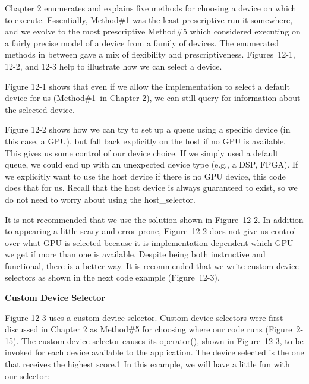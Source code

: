 Chapter 2 enumerates and explains five methods for choosing a device on which to execute. Essentially, Method\#1 was the least prescriptive run it somewhere, and we evolve to the most prescriptive Method\#5 which considered executing on a fairly precise model of a device from a family of devices. The enumerated methods in between gave a mix of flexibility and prescriptiveness. Figures 12-1, 12-2, and 12-3 help to illustrate how we can select a device.\par

Figure 12-1 shows that even if we allow the implementation to select a default device for us (Method\#1 in Chapter 2), we can still query for information about the selected device.\par

Figure 12-2 shows how we can try to set up a queue using a specific device (in this case, a GPU), but fall back explicitly on the host if no GPU is available. This gives us some control of our device choice. If we simply used a default queue, we could end up with an unexpected device type (e.g., a DSP, FPGA). If we explicitly want to use the host device if there is no GPU device, this code does that for us. Recall that the host device is always guaranteed to exist, so we do not need to worry about using the host\_selector.\par

It is not recommended that we use the solution shown in Figure 12-2. In addition to appearing a little scary and error prone, Figure 12-2 does not give us control over what GPU is selected because it is implementation dependent which GPU we get if more than one is available. Despite being both instructive and functional, there is a better way. It is recommended that we write custom device selectors as shown in the next code example (Figure 12-3).\par


\hspace*{\fill} \par %
\textbf{Custom Device Selector}

Figure 12-3 uses a custom device selector. Custom device selectors were first discussed in Chapter 2 as Method\#5 for choosing where our code runs (Figure 2-15). The custom device selector causes its operator(), shown in Figure 12-3, to be invoked for each device available to the application. The device selected is the one that receives the highest score.1 In this example, we will have a little fun with our selector:\par

